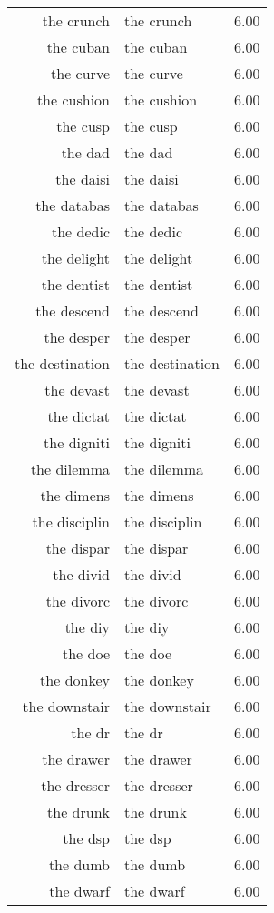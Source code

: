 \begin{table}[ht]
\begin{tabular}{rlr}
  the crunch & the crunch & 6.00 \\ 
  the cuban & the cuban & 6.00 \\ 
  the curve & the curve & 6.00 \\ 
  the cushion & the cushion & 6.00 \\ 
  the cusp & the cusp & 6.00 \\ 
  the dad & the dad & 6.00 \\ 
  the daisi & the daisi & 6.00 \\ 
  the databas & the databas & 6.00 \\ 
  the dedic & the dedic & 6.00 \\ 
  the delight & the delight & 6.00 \\ 
  the dentist & the dentist & 6.00 \\ 
  the descend & the descend & 6.00 \\ 
  the desper & the desper & 6.00 \\ 
  the destination & the destination & 6.00 \\ 
  the devast & the devast & 6.00 \\ 
  the dictat & the dictat & 6.00 \\ 
  the digniti & the digniti & 6.00 \\ 
  the dilemma & the dilemma & 6.00 \\ 
  the dimens & the dimens & 6.00 \\ 
  the disciplin & the disciplin & 6.00 \\ 
  the dispar & the dispar & 6.00 \\ 
  the divid & the divid & 6.00 \\ 
  the divorc & the divorc & 6.00 \\ 
  the diy & the diy & 6.00 \\ 
  the doe & the doe & 6.00 \\ 
  the donkey & the donkey & 6.00 \\ 
  the downstair & the downstair & 6.00 \\ 
  the dr & the dr & 6.00 \\ 
  the drawer & the drawer & 6.00 \\ 
  the dresser & the dresser & 6.00 \\ 
  the drunk & the drunk & 6.00 \\ 
  the dsp & the dsp & 6.00 \\ 
  the dumb & the dumb & 6.00 \\ 
  the dwarf & the dwarf & 6.00 \\ 

\end{tabular}
\end{table}
